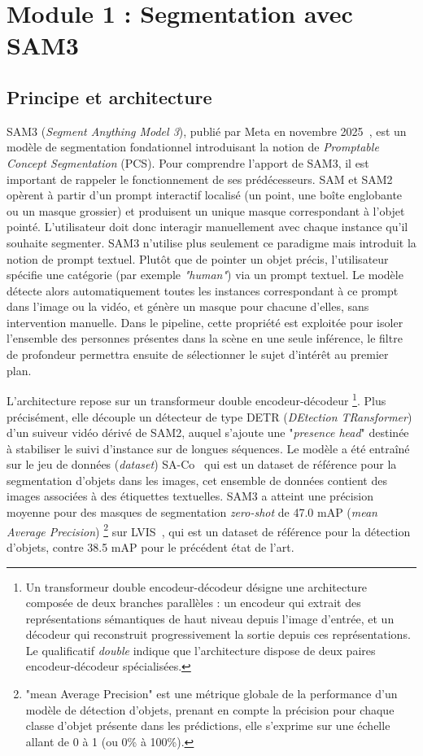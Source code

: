 \section{Module 1 : Segmentation avec SAM3} \label{sec:module-1}

\subsection{Principe et architecture}

SAM3 (\textit{Segment Anything Model 3}), publié par Meta en novembre 2025~\cite{SAM3-2025}, est un modèle de segmentation fondationnel introduisant la notion de \textit{Promptable Concept Segmentation} (PCS). Pour comprendre l'apport de SAM3, il est important de rappeler le fonctionnement de ses prédécesseurs. SAM et SAM2 opèrent à partir d'un prompt interactif localisé (un point, une boîte englobante ou un masque grossier) et produisent un unique masque correspondant à l'objet pointé. L'utilisateur  doit donc interagir manuellement avec chaque instance qu'il souhaite segmenter. SAM3 n'utilise plus seulement ce paradigme mais introduit la notion de prompt textuel. Plutôt que de pointer un objet précis, l'utilisateur spécifie une catégorie (par exemple \emph{"human"}) via un prompt textuel. Le modèle détecte alors automatiquement toutes les instances correspondant à ce prompt dans l'image ou la vidéo, et génère un masque pour chacune d'elles, sans intervention manuelle. Dans le pipeline, cette propriété est exploitée pour isoler l'ensemble des personnes présentes dans la scène en une seule inférence, le filtre de profondeur permettra ensuite de sélectionner le sujet d'intérêt au premier plan.

L'architecture repose sur un transformeur double encodeur-décodeur \footnote{Un transformeur double encodeur-décodeur désigne une architecture composée de deux branches parallèles : un encodeur qui extrait des représentations sémantiques de haut niveau depuis l'image d'entrée, et un décodeur qui reconstruit progressivement la sortie depuis ces représentations. Le qualificatif \textit{double} indique que l'architecture dispose de deux paires encodeur-décodeur spécialisées.}. Plus précisément, elle découple un détecteur de type DETR (\textit{DEtection TRansformer}) d'un suiveur vidéo dérivé de SAM2, auquel s'ajoute une "\textit{presence head}" destinée à stabiliser le suivi d'instance sur de longues séquences. Le modèle a été entraîné sur le jeu de données (\textit{dataset}) SA-Co~\cite{SAM3-SA-Co-2025} qui est un dataset de référence pour la segmentation d'objets dans les images, cet ensemble de données contient des images associées à des étiquettes textuelles. SAM3 a atteint une précision moyenne pour des masques de segmentation \textit{zero-shot} de 47.0 mAP (\textit{mean Average Precision}) \footnote{"mean Average Precision" est une métrique globale de la performance d'un modèle de détection d'objets, prenant en compte la précision pour chaque classe d'objet présente dans les prédictions, elle s'exprime sur une échelle allant de 0 à 1 (ou 0\% à 100\%).} sur LVIS~\cite{LVIS-Dataset-2019}, qui est un dataset de référence pour la détection d'objets, contre 38.5 mAP pour le précédent état de l'art. 


